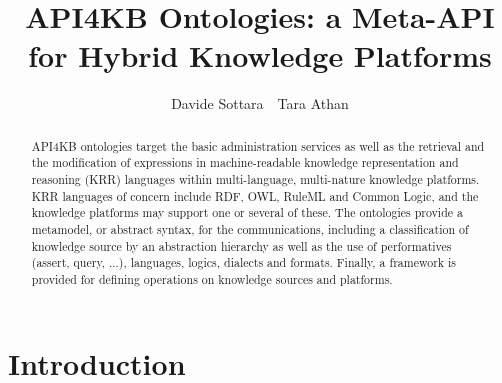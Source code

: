 \documentclass[runningheads]{llncs}
\title{API4KB Ontologies: a Meta-API for Hybrid Knowledge Platforms}
\date{}
\begin{document}
%
\author{Davide Sottara\ \ Tara Athan}

%
\maketitle

\begin{abstract}
API4KB ontologies target the basic administration
services as well as the retrieval and the modification of expressions in machine-readable knowledge representation and reasoning (KRR) languages within multi-language, multi-nature knowledge platforms.
KRR languages of concern include RDF, OWL, RuleML and Common Logic, and the knowledge platforms may support one or several of these.
The ontologies provide a metamodel, or abstract syntax, for the communications, including a classification of knowledge source by an abstraction hierarchy as well as the use of performatives (assert, query, ...), languages, logics, dialects and formats. Finally, a framework is provided for defining operations on knowledge sources and platforms.
\end{abstract}

%
\section{Introduction}
\label{intro}
\end{document}
